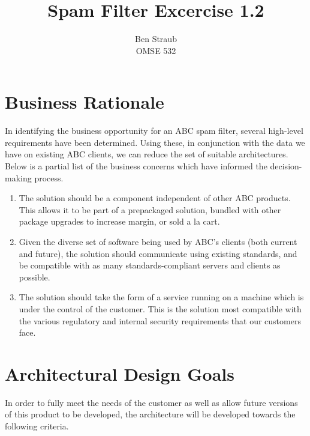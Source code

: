 \documentclass[11pt,letterpaper]{article}
\begin{document}
\author{Ben Straub\\OMSE 532}
\title{Spam Filter Excercise 1.2}
\maketitle


\section{Business Rationale}

In identifying the business opportunity for an ABC spam filter, several
high-level requirements have been determined.  Using these, in conjunction
with the data we have on existing ABC clients, we can reduce the set of
suitable architectures.  Below is a partial list of the business concerns
which have informed the decision-making process.

\begin{enumerate}
\item The solution should be a component independent of other ABC products.
  This allows it to be part of a prepackaged solution, bundled with other
  package upgrades to increase margin, or sold a la cart.
\item Given the diverse set of software being used by ABC's clients (both
  current and future), the solution should communicate using existing
  standards, and be compatible with as many standards-compliant servers and
  clients as possible.
\item The solution should take the form of a service running on a machine
  which is under the control of the customer.  This is the solution most
  compatible with the various regulatory and internal security requirements
  that our customers face.
\end{enumerate}


\section{Architectural Design Goals}

In order to fully meet the needs of the customer as well as allow future
versions of this product to be developed, the architecture will be developed
towards the following criteria.
\end{document}
